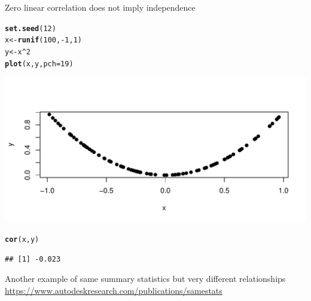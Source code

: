 \documentclass[10pt,handout]{beamer}\usepackage[]{graphicx}\usepackage[]{color}
\makeatletter
\def\maxwidth{ %
  \ifdim\Gin@nat@width>\linewidth
    \linewidth
  \else
    \Gin@nat@width
  \fi
}
\newcommand{\hlnum}[1]{\textcolor[rgb]{0.686,0.059,0.569}{#1}}%
\newcommand{\hlopt}[1]{\textcolor[rgb]{0,0,0}{#1}}%
\newcommand{\hlstd}[1]{\textcolor[rgb]{0.345,0.345,0.345}{#1}}%
\newcommand{\hlkwb}[1]{\textcolor[rgb]{0.69,0.353,0.396}{#1}}%
\newcommand{\hlkwc}[1]{\textcolor[rgb]{0.333,0.667,0.333}{#1}}%
\newcommand{\hlkwd}[1]{\textcolor[rgb]{0.737,0.353,0.396}{\textbf{#1}}}%
\newenvironment{kframe}{%
 \def\at@end@of@kframe{}%
 \ifinner\ifhmode%
  \def\at@end@of@kframe{\end{minipage}}%
  \begin{minipage}{\columnwidth}%
 \fi\fi%
 \def\FrameCommand##1{\hskip\@totalleftmargin \hskip-\fboxsep
 \colorbox{shadecolor}{##1}\hskip-\fboxsep
     \hskip-\linewidth \hskip-\@totalleftmargin \hskip\columnwidth}%
 \MakeFramed {\advance\hsize-\width
   \@totalleftmargin\z@ \linewidth\hsize
   \@setminipage}}%
 {\par\unskip\endMakeFramed%
 \at@end@of@kframe}
\newenvironment{knitrout}{}{} %
\makeatother
\begin{document}
\begin{frame}[fragile]{Zero linear correlation does not imply independence}
\begin{knitrout}\scriptsize
{}\color{fgcolor}\begin{kframe}
\begin{alltt}
\hlkwd{set.seed}\hlstd{(}\hlnum{12}\hlstd{)}
\hlstd{x} \hlkwb{<-} \hlkwd{runif}\hlstd{(}\hlnum{100}\hlstd{,}\hlopt{-}\hlnum{1}\hlstd{,}\hlnum{1}\hlstd{)}
\hlstd{y} \hlkwb{<-} \hlstd{x}\hlopt{^}\hlnum{2}
\hlkwd{plot}\hlstd{(x,y,} \hlkwc{pch} \hlstd{=} \hlnum{19}\hlstd{)}
\end{alltt}
\end{kframe}

{\centering \includegraphics[width=\maxwidth]{figure/unnamed-chunk-6-1} 

}


\begin{kframe}\begin{alltt}
\hlkwd{cor}\hlstd{(x,y)}
\end{alltt}
\begin{verbatim}
## [1] -0.023
\end{verbatim}
\end{kframe}
\end{knitrout}
\end{frame}


\begin{frame}{Another example of same summary statistics but very different relationships}
\url{https://www.autodeskresearch.com/publications/samestats}
\end{frame}
\end{document}

